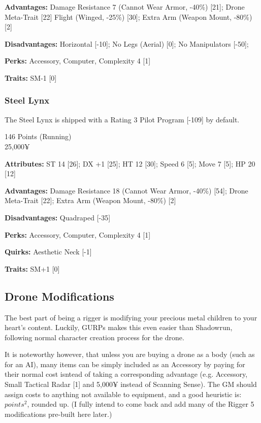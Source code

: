 \begin{multicols*}{2}
	\textbf{Advantages:} 
	Damage Resistance 7 (Cannot Wear Armor, -40\%) [21]; Drone Meta-Trait [22] Flight (Winged, -25\%) [30]; Extra Arm (Weapon Mount, -80\%) [2]
	
	\textbf{Disadvantages:} 
	Horizontal [-10]; No Legs (Aerial) [0]; No Manipulators [-50]; 
	
	\textbf{Perks:}
	Accessory, Computer, Complexity 4 [1]
	
	\textbf{Traits:}
	SM-1 [0]
	
	\subsubsection{Steel Lynx}
	
	The Steel Lynx is shipped with a Rating 3 Pilot Program [-109] by default.
	
	\begin{flushright}
		146 Points (Running)\\
		25,000¥
	\end{flushright}
	
	\textbf{Attributes:} 
	ST 14 [26]; DX +1 [25]; HT 12 [30]; 
	Speed 6 [5]; Move 7 [5]; HP 20 [12]
	
	\textbf{Advantages:} 
	Damage Resistance 18 (Cannot Wear Armor, -40\%) [54]; Drone Meta-Trait [22]; Extra Arm (Weapon Mount, -80\%) [2]
	
	\textbf{Disadvantages:} 
	Quadraped [-35]
	
	\textbf{Perks:}
	Accessory, Computer, Complexity 4 [1]
	
	\textbf{Quirks:}
	Aesthetic Neck [-1]
	
	\textbf{Traits:}
	SM+1 [0]
	
	\subsection{Drone Modifications}
	
	The best part of being a rigger is modifying your precious metal children to your heart's content. Luckily, GURPs makes this even easier than Shadowrun, following normal character creation process for the drone. 
	
	It is noteworthy however, that unless you are buying a drone as a body (such as for an AI), many items can be simply included as an Accessory by paying for their normal cost isntead of taking a corresponding advantage (e.g. Accessory, Small Tactical Radar [1] and 5,000¥ instead of Scanning Sense). The GM should assign costs to anything not available to equipment, and a good heuristic is: $points^{2}$, rounded up. (I fully intend to come back and add many of the Rigger 5 modifications pre-built here later.)
	
\end{multicols*}

